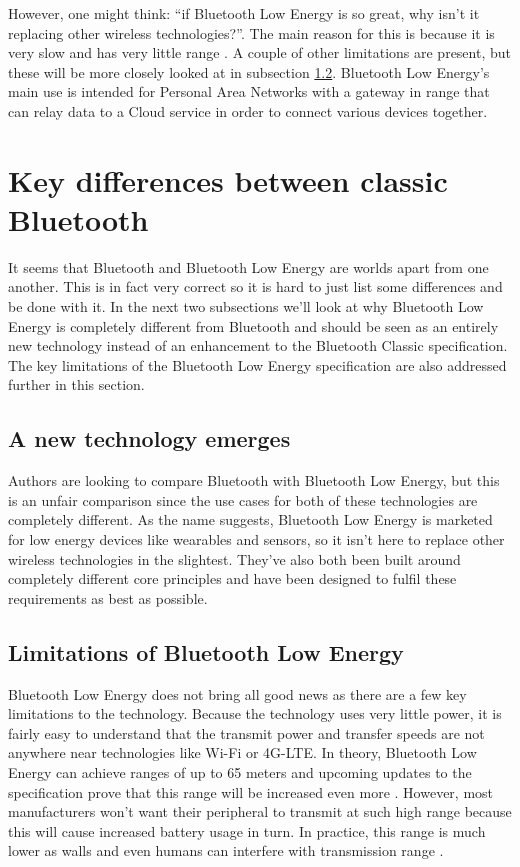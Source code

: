 \documentclass[pdftex,a4paper,12pt,twoside]{report}
\begin{document}
However, one might think: ``if Bluetooth Low Energy is so great, why isn't it replacing other wireless technologies?''. The main reason for this is because it is very slow and has very little range \citep{heydon2012bluetooth}. A couple of other limitations are present, but these will be more closely looked at in subsection \ref{subsec:limitations}. Bluetooth Low Energy's main use is intended for Personal Area Networks with a gateway in range that can relay data to a Cloud service in order to connect various devices together.

\section{Key differences between classic Bluetooth}
\label{sec:differencesclassic}
It seems that Bluetooth and Bluetooth Low Energy are worlds apart from one another. This is in fact very correct so it is hard to just list some differences and be done with it. In the next two subsections we'll look at why Bluetooth Low Energy is completely different from Bluetooth and should be seen as an entirely new technology instead of an enhancement to the Bluetooth Classic specification. The key limitations of the Bluetooth Low Energy specification are also addressed further in this section.

\subsection{A new technology emerges}
\label{subsec:newtechnology}
Authors are looking to compare Bluetooth with Bluetooth Low Energy, but this is an unfair comparison since the use cases for both of these technologies are completely different. As the name suggests, Bluetooth Low Energy is marketed for low energy devices like wearables and sensors, so it isn't here to replace other wireless technologies in the slightest. They've also both been built around completely different core principles and have been designed to fulfil these requirements as best as possible.

\subsection{Limitations of Bluetooth Low Energy}
\label{subsec:limitations}
Bluetooth Low Energy does not bring all good news as there are a few key limitations to the technology. Because the technology uses very little power, it is fairly easy to understand that the transmit power and transfer speeds are not anywhere near technologies like Wi-Fi or 4G-LTE. In theory, Bluetooth Low Energy can achieve ranges of up to 65 meters and upcoming updates to the specification prove that this range will be increased even more \citep{heydon2012bluetooth}. However, most manufacturers won't want their peripheral to transmit at such high range because this will cause increased battery usage in turn. In practice, this range is much lower as walls and even humans can interfere with transmission range \citep{faragher2014analysis}.
\end{document}
